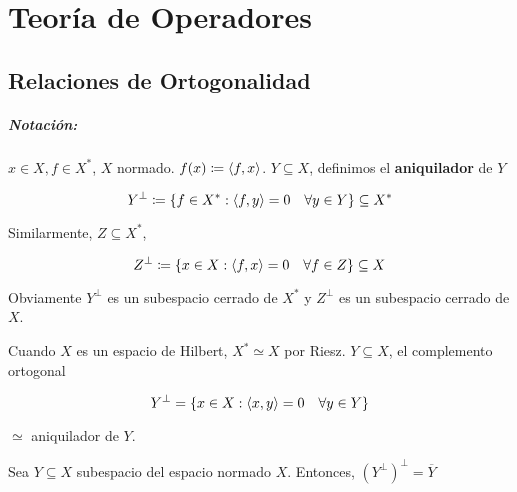 \chapter{Teoría de Operadores}

\section{Relaciones de Ortogonalidad}

\paragraph*{Notación:} $x\in X,f\in X^*$, $X$ normado. $f(x)\coloneqq \left\langle f,x\right\rangle$. $Y\subseteq X$, definimos el \textbf{aniquilador} de $Y$

\[Y^\perp\coloneqq \{f\in X^*:\left\langle f,y\right\rangle=0\quad\forall y\in Y\}\subseteq X^*\]

Similarmente, $Z\subseteq X^*$,

\[Z^\perp\coloneqq \{x\in X:\left\langle f,x\right\rangle=0\quad\forall f\in Z\}\subseteq X\]

Obviamente $Y^\perp$ es un subespacio cerrado de $X^*$ y $Z^\perp$ es un subespacio cerrado de $X$.

\begin{fexample}
   Cuando $X$ es un espacio de Hilbert, $X^*\simeq X$ por Riesz. $Y\subseteq X$, el complemento ortogonal 

   \[Y^\perp=\{x\in X:\left\langle x,y\right\rangle=0\quad\forall y\in Y\}\]

   $\simeq$ aniquilador de $Y$.
\end{fexample}

\begin{fproposition}
   Sea $Y\subseteq X$ subespacio del espacio normado $X$. Entonces, $(Y^\perp)^\perp=\overline{Y}$
\end{fproposition}

